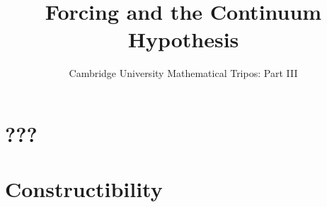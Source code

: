 \documentclass{article}
\title{Forcing and the Continuum Hypothesis}
\author{Cambridge University Mathematical Tripos: Part III}
\begin{document}
\maketitle

\tableofcontentsnewpage{}

\section{???}

\section{Constructibility}

\end{document}
